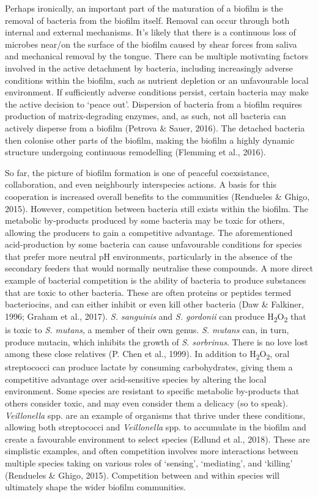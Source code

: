 \documentclass[
  letterpaper,
]{book}
\begin{document}
Perhaps ironically, an important part of the maturation of a biofilm is
the removal of bacteria from the biofilm itself. Removal can occur
through both internal and external mechanisms. It's likely that there is
a continuous loss of microbes near/on the surface of the biofilm caused
by shear forces from saliva and mechanical removal by the tongue. There
can be multiple motivating factors involved in the active detachment by
bacteria, including increasingly adverse conditions within the biofilm,
such as nutrient depletion or an unfavourable local environment. If
sufficiently adverse conditions persist, certain bacteria may make the
active decision to `peace out'. Dispersion of bacteria from a biofilm
requires production of matrix-degrading enzymes, and, as such, not all
bacteria can actively disperse from a biofilm (Petrova \& Sauer, 2016).
The detached bacteria then colonise other parts of the biofilm, making
the biofilm a highly dynamic structure undergoing continuous remodelling
(Flemming et al., 2016).

So far, the picture of biofilm formation is one of peaceful
coexsistance, collaboration, and even neighbourly interspecies actions.
A basis for this cooperation is increased overall benefits to the
communities (Rendueles \& Ghigo, 2015). However, competition between
bacteria still exists within the biofilm. The metabolic by-products
produced by some bacteria may be toxic for others, allowing the
producers to gain a competitive advantage. The aforementioned
acid-production by some bacteria can cause unfavourable conditions for
species that prefer more neutral pH environments, particularly in the
absence of the secondary feeders that would normally neutralise these
compounds. A more direct example of bacterial competition is the ability
of bacteria to produce substances that are toxic to other bacteria.
These are often proteins or peptides termed bacteriocins, and can either
inhibit or even kill other bacteria (Daw \& Falkiner, 1996; Graham et
al., 2017). \emph{S. sanguinis} and \emph{S. gordonii} can produce
H\textsubscript{2}O\textsubscript{2} that is toxic to \emph{S. mutans},
a member of their own genus. \emph{S. mutans} can, in turn, produce
mutacin, which inhibits the growth of \emph{S. sorbrinus}. There is no
love lost among these close relatives (P. Chen et al., 1999). In
addition to H\textsubscript{2}O\textsubscript{2}, oral streptococci can
produce lactate by consuming carbohydrates, giving them a competitive
advantage over acid-sensitive species by altering the local environment.
Some species are resistant to specific metabolic by-products that others
consider toxic, and may even consider them a delicacy (so to speak).
\emph{Veillonella} spp. are an example of organisms that thrive under
these conditions, allowing both streptococci and \emph{Veillonella} spp.
to accumulate in the biofilm and create a favourable environment to
select species (Edlund et al., 2018). These are simplistic examples, and
often competition involves more interactions between multiple species
taking on various roles of `sensing', `mediating', and `killing'
(Rendueles \& Ghigo, 2015). Competition between and within species will
ultimately shape the wider biofilm communities.
\end{document}
